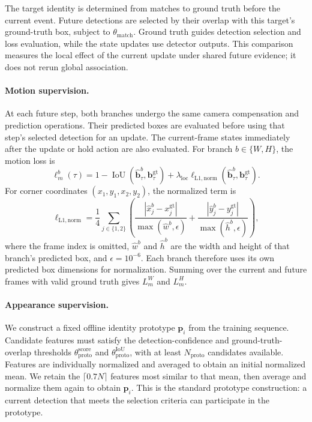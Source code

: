 \documentclass[a4paper,fleqn]{cas-sc}
\begin{document}
The target identity is determined from matches to ground truth before the current event. Future detections are selected by their overlap with this target's ground-truth box, subject to $\theta_{\mathrm{match}}$. Ground truth guides detection selection and loss evaluation, while the state updates use detector outputs. This comparison measures the local effect of the current update under shared future evidence; it does not rerun global association.

\paragraph{Motion supervision.}
At each future step, both branches undergo the same camera compensation and prediction operations. Their predicted boxes are evaluated before using that step's selected detection for an update. The current-frame states immediately after the update or hold action are also evaluated. For branch $b\in\{W,H\}$, the motion loss is
\begin{equation}
\ell_m^b(\tau)=
1-\operatorname{IoU}(\hat{\bm{b}}_\tau^b,\bm{b}_\tau^{\mathrm{gt}})
+\lambda_{\mathrm{loc}}\ell_{\mathrm{L1,norm}}
(\hat{\bm{b}}_\tau^b,\bm{b}_\tau^{\mathrm{gt}}).
\label{eq:motion_loss}
\end{equation}
For corner coordinates $(x_1,y_1,x_2,y_2)$, the normalized term is
\begin{equation}
\ell_{\mathrm{L1,norm}}
=\frac{1}{4}\sum_{j\in\{1,2\}}
\left(
\frac{|\hat{x}_j^b-x_j^{\mathrm{gt}}|}{\max(\hat{w}^b,\epsilon)}
+\frac{|\hat{y}_j^b-y_j^{\mathrm{gt}}|}{\max(\hat{h}^b,\epsilon)}
\right),
\label{eq:motion_normalization}
\end{equation}
where the frame index is omitted, $\hat{w}^b$ and $\hat{h}^b$ are the width and height of that branch's predicted box, and $\epsilon=10^{-6}$. Each branch therefore uses its own predicted box dimensions for normalization. Summing over the current and future frames with valid ground truth gives $L_m^W$ and $L_m^H$.

\paragraph{Appearance supervision.}
We construct a fixed offline identity prototype $\bm{p}_i$ from the training sequence. Candidate features must satisfy the detection-confidence and ground-truth-overlap thresholds $\theta_{\mathrm{proto}}^{\mathrm{score}}$ and $\theta_{\mathrm{proto}}^{\mathrm{IoU}}$, with at least $N_{\mathrm{proto}}$ candidates available. Features are individually normalized and averaged to obtain an initial normalized mean. We retain the $\lceil0.7N\rceil$ features most similar to that mean, then average and normalize them again to obtain $\bm{p}_i$. This is the standard prototype construction: a current detection that meets the selection criteria can participate in the prototype.
\end{document}
